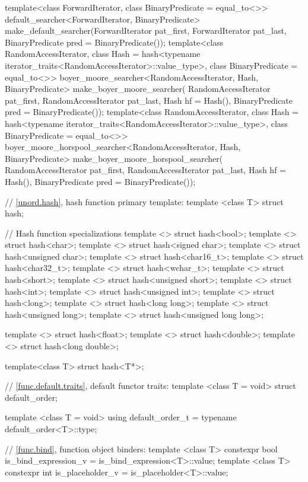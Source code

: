 \begin{codeblock}
{  template<class ForwardIterator, class BinaryPredicate = equal_to<>>
  default_searcher<ForwardIterator, BinaryPredicate>
  make_default_searcher(ForwardIterator pat_first, ForwardIterator pat_last,
                        BinaryPredicate pred = BinaryPredicate());
  template<class RandomAccessIterator,
           class Hash = hash<typename iterator_traits<RandomAccessIterator>::value_type>,
           class BinaryPredicate = equal_to<>>
  boyer_moore_searcher<RandomAccessIterator, Hash, BinaryPredicate>
  make_boyer_moore_searcher(
      RandomAccessIterator pat_first, RandomAccessIterator pat_last,
      Hash hf = Hash(), BinaryPredicate pred = BinaryPredicate());
  template<class RandomAccessIterator,
           class Hash = hash<typename iterator_traits<RandomAccessIterator>::value_type>,
           class BinaryPredicate = equal_to<>>
  boyer_moore_horspool_searcher<RandomAccessIterator, Hash, BinaryPredicate>
  make_boyer_moore_horspool_searcher(
      RandomAccessIterator pat_first, RandomAccessIterator pat_last,
      Hash hf = Hash(), BinaryPredicate pred = BinaryPredicate());

  // \ref{unord.hash}, hash function primary template:
  template <class T> struct hash;

  // Hash function specializations
  template <> struct hash<bool>;
  template <> struct hash<char>;
  template <> struct hash<signed char>;
  template <> struct hash<unsigned char>;
  template <> struct hash<char16_t>;
  template <> struct hash<char32_t>;
  template <> struct hash<wchar_t>;
  template <> struct hash<short>;
  template <> struct hash<unsigned short>;
  template <> struct hash<int>;
  template <> struct hash<unsigned int>;
  template <> struct hash<long>;
  template <> struct hash<long long>;
  template <> struct hash<unsigned long>;
  template <> struct hash<unsigned long long>;

  template <> struct hash<float>;
  template <> struct hash<double>;
  template <> struct hash<long double>;

  template<class T> struct hash<T*>;

  // \ref{func.default.traits}, default functor traits:
  template <class T = void>
  struct default_order;

  template <class T = void>
  using default_order_t = typename default_order<T>::type; 

  // \ref{func.bind}, function object binders:
  template <class T> constexpr bool is_bind_expression_v
    = is_bind_expression<T>::value;
  template <class T> constexpr int is_placeholder_v
    = is_placeholder<T>::value;
}
\end{codeblock}

